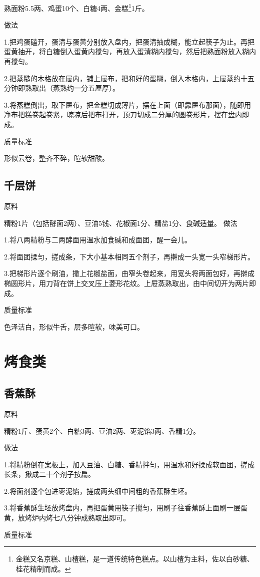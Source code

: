 \documentclass{ctexbook}
\begin{document}
熟面粉5.5两、鸡蛋10个、白糖4两、金糕\footnote{金糕又名京糕、山楂糕，是一道传统特色糕点。以山楂为主料，佐以白砂糖、桂花精制而成。}1斤。

做法

1.把鸡蛋磕开，蛋清与蛋黄分别放入盘内，把蛋清抽成糊，能立起筷子为止。再把蛋黄抽开，将白糖倒入蛋黄内搅匀，再放入蛋清糊内搅匀，然后把熟面粉放入糊内再搅匀。

2.把蒸糙的木格放在屉内，铺上屉布，把和好的蛋糊，倒入木格内，上屉蒸约十五分钟即熟取出（蒸熟约一分五厘厚）。

3.将蒸糕倒出，取下屉布，把金糕切成薄片，摆在上面（即靠屉布那面），随即用净布把糕卷起卷紧，晾凉后把布打开，顶刀切成二分厚的圆卷形片，摆在盘内即成。

质量标准

形似云卷，整齐不碎，暄软甜酸。
\subsection{千层饼}
原料

精粉1片（包括酵面2两）、豆油5钱、花椒面1分、精盐1分、食碱适量。
做法

1.将八两精粉与二两酵面用温水加食碱和成面团，醒一会儿。

2.将面团揉匀，搓成条，下大小基本相同五个剂子，再擀成一头宽一头窄梯形片。

3.把梯形片逐个刷油，撒上花椒盐面，由窄头卷起来，用宽头将两面包好，再擀成椭圆形片，用刀背在饼上交叉压上菱形花纹。上屉蒸熟取出，由中间切开为两片即成。

质量标准

色泽洁白，形似牛舌，层多暄软，味美可口。
\section{烤食类}
\subsection{香蕉酥}
原料

精粉1斤、蛋黄2个、白糖3两、豆油2两、枣泥馅3两、香精1分。

做法

1.将精粉倒在案板上，加入豆油、白糖、香精拌匀，用温水和好揉成软面团，搓成长条，揪成二十个剂子按扁。

2.将面剂逐个包进枣泥馅，搓成两头细中间粗的香蕉酥生坯。

3.将香蕉酥生坯放烤盘内，再把蛋黄用筷子搅匀，用刷子往香蕉酥上面刷一层蛋黄，放烤炉内烤七八分钟成熟取出即可。

质量标准
\end{document}

